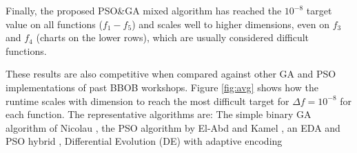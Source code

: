 \documentclass[runningheads]{llncs}
\begin{document}
%
Finally, the proposed PSO\&GA mixed algorithm has reached the $10^{-8}$ target
value on all functions ($f_1-f_5$) and scales well to higher dimensions, even
on $f_3$ and $f_4$ (charts on the lower rows), which are usually
considered difficult functions. %

These results are also competitive when compared against other GA and PSO
implementations of past BBOB workshops. Figure \ref{fig:avg} shows
how the runtime scales with dimension to reach the most difficult target
for $\Delta f = 10^{-8}$ for each function.
The representative algorithms are:
The simple binary GA algorithm of Nicolau \cite{nicolau2009application},
the PSO algorithm by El-Abd and Kamel \cite{el2009black}, an EDA and PSO
hybrid \cite{el2009blackHybrid}, %
Differential Evolution (DE) with adaptive encoding \cite{povsik2012benchmarking}
\end{document}
